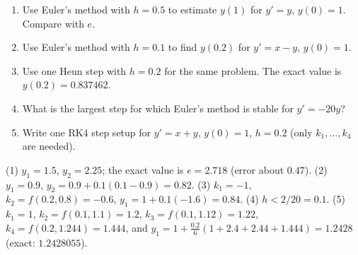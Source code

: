 \begin{practicebox}
\begin{enumerate}
  \item Use Euler's method with $h=0.5$ to estimate $y(1)$ for $y'=y$, $y(0)=1$. Compare with $e$.
  \item Use Euler's method with $h = 0.1$ to find $y(0.2)$ for $y' = x - y$, $y(0)=1$.
  \item Use one Heun step with $h=0.2$ for the same problem. The exact value is $y(0.2) = 0.837462$.
  \item What is the largest step for which Euler's method is stable for $y' = -20y$?
  \item Write one RK4 step setup for $y'=x+y$, $y(0)=1$, $h=0.2$ (only $k_1,\dots,k_4$ are needed).
\end{enumerate}
\end{practicebox}

\begin{answerbox}
(1) $y_1 = 1.5$, $y_2 = 2.25$; the exact value is $e = 2.718$ (error about $0.47$). \quad (2) $y_1 = 0.9$, $y_2 = 0.9 + 0.1(0.1 - 0.9) = 0.82$. \quad (3) $k_1 = -1$, $k_2 = f(0.2, 0.8) = -0.6$, $y_1 = 1 + 0.1(-1.6) = 0.84$. \quad (4) $h < 2/20 = 0.1$. \quad (5) $k_1 = 1$, $k_2 = f(0.1, 1.1) = 1.2$, $k_3 = f(0.1, 1.12) = 1.22$, $k_4 = f(0.2, 1.244) = 1.444$, and $y_1 = 1 + \frac{0.2}{6}(1 + 2.4 + 2.44 + 1.444) = 1.2428$ (exact: $1.2428055$).
\end{answerbox}
